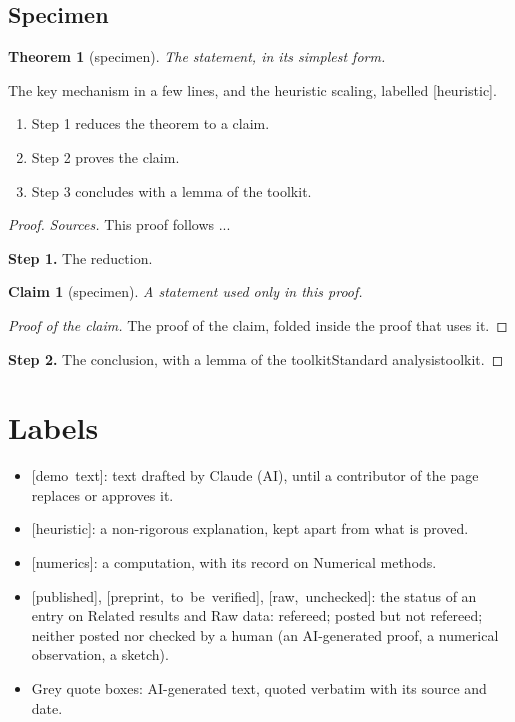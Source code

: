 \documentclass[11pt]{article}
\makeatletter
\newtheorem{theorem}{Theorem}
\newtheorem*{claim}{Claim}
\theoremstyle{definition}
\theoremstyle{remark}
\newcommand{\ed@runin}[1]{\par\topsep6\p@\@plus6\p@\relax\trivlist\item[\hskip\labelsep\itshape#1\@addpunct{.}]\ignorespaces}
\newenvironment{idea}[1][Idea]{\ed@runin{#1}}{\endtrivlist\@endpefalse}
\newenvironment{architecture}[1][Proof architecture]{\ed@runin{#1}}{\endtrivlist\@endpefalse}
\newcommand{\ed@label}[1]{\mbox{\footnotesize[#1]}}
\newcommand{\demo}[1]{\ed@label{demo text}}
\newcommand{\heuristic}[1]{\ed@label{heuristic}}
\newcommand{\numerics}[1]{\ed@label{numerics}}
\newcommand{\published}[1]{\ed@label{published}}
\newcommand{\preprint}[1]{\ed@label{preprint, to be verified}}
\newcommand{\raw}[1]{\ed@label{raw, unchecked}}
\newcommand{\wikilink}[2]{\ifx\relax#2\relax#1\else#2\fi}
\makeatother
\begin{document}
\subsection{Specimen}
\begin{theorem}[specimen]\label{thm-specimen}
The statement, in its simplest form.
\end{theorem}
\begin{idea}
The key mechanism in a few lines, and the heuristic scaling, labelled \heuristic{}.
\end{idea}
\begin{architecture}
\begin{enumerate}
  \item Step 1 reduces the theorem to a claim.
  \item Step 2 proves the claim.
  \item Step 3 concludes with a lemma of the toolkit.
\end{enumerate}
\end{architecture}
\begin{proof}\label{proof-specimen}
\emph{Sources.} This proof follows ...

\textbf{Step 1.} The reduction.
\begin{claim}[specimen]\label{clm-specimen}
A statement used only in this proof.
\end{claim}
\begin{proof}[Proof of the claim]\label{proof-clm-specimen}
The proof of the claim, folded inside the proof that uses it.
\end{proof}
\textbf{Step 2.} The conclusion, with a lemma of the \wikilink{Standard analysis}{toolkit}.
\end{proof}

\section{Labels}
\begin{itemize}
  \item \demo{}: text drafted by Claude (AI), until a contributor of the page replaces or approves it.
  \item \heuristic{}: a non-rigorous explanation, kept apart from what is proved.
  \item \numerics{}: a computation, with its record on \wikilink{Numerical methods}{}.
  \item \published{}, \preprint{}, \raw{}: the status of an entry on \wikilink{Related results}{} and \wikilink{Raw data}{}: refereed; posted but not refereed; neither posted nor checked by a human (an AI-generated proof, a numerical observation, a sketch).
  \item Grey quote boxes: AI-generated text, quoted verbatim with its source and date.
\end{itemize}
\end{document}
